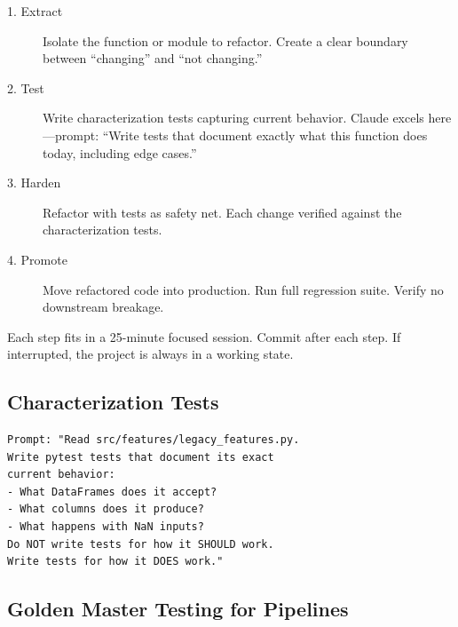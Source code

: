 \begin{description}
  \item[1. Extract] Isolate the function or module to refactor.
    Create a clear boundary between ``changing'' and ``not changing.''

  \item[2. Test] Write characterization tests capturing current behavior.
    Claude excels here---prompt: ``Write tests that document exactly
    what this function does today, including edge cases.''

  \item[3. Harden] Refactor with tests as safety net.
    Each change verified against the characterization tests.

  \item[4. Promote] Move refactored code into production.
    Run full regression suite. Verify no downstream breakage.
\end{description}

\begin{tipbox}
Each step fits in a 25-minute focused session.
Commit after each step.
If interrupted, the project is always in a working state.
\end{tipbox}

\subsection{Characterization Tests}


\begin{verbatim}
Prompt: "Read src/features/legacy_features.py.
Write pytest tests that document its exact
current behavior:
- What DataFrames does it accept?
- What columns does it produce?
- What happens with NaN inputs?
Do NOT write tests for how it SHOULD work.
Write tests for how it DOES work."
\end{verbatim}


\subsection{Golden Master Testing for Pipelines}



